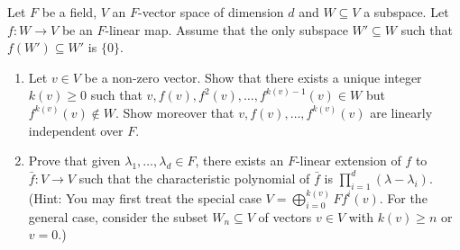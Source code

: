 \begin{exercise}
\label{algebra:2018:10}
Let $F$ be a field, $V$ an $F$-vector space of dimension $d$ and $W \subseteq V$ a subspace. Let $f: W \to V$ be an $F$-linear map. Assume that the only subspace $W' \subseteq W$ such that $f(W') \subseteq W'$ is $\{0\}$.
\begin{enumerate}
    \item Let $v \in V$ be a non-zero vector. Show that there exists a unique integer $k(v) \geq 0$ such that $v, f(v), f^2(v), \dots, f^{k(v)-1}(v) \in W$ but $f^{k(v)}(v) \notin W$. Show moreover that $v, f(v), \dots, f^{k(v)}(v)$ are linearly independent over $F$.
    \item Prove that given $\lambda_1, \dots, \lambda_d \in F$, there exists an $F$-linear extension of $f$ to $\bar{f}: V \to V$ such that the characteristic polynomial of $\bar{f}$ is $\prod_{i=1}^d (\lambda - \lambda_i)$. (Hint: You may first treat the special case $V = \bigoplus_{i=0}^{k(v)} F f^i(v)$. For the general case, consider the subset $W_n \subseteq V$ of vectors $v \in V$ with $k(v) \geq n$ or $v = 0$.)
\end{enumerate}
\end{exercise}
